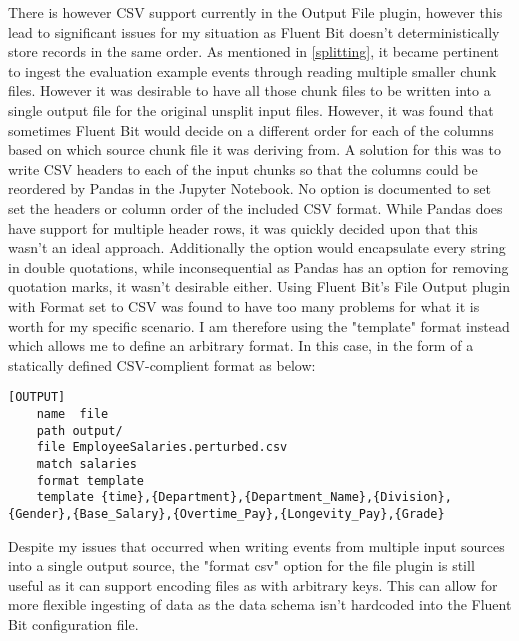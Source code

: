 There is however CSV support currently in the Output File plugin, however this lead to significant issues for my situation as Fluent Bit doesn't deterministically store records in the same order. As mentioned in \ref{splitting}, it became pertinent to ingest the evaluation example events through reading multiple smaller chunk files. However it was desirable to have all those chunk files to be written into a single output file for the original unsplit input files. However, it was found that sometimes Fluent Bit would decide on a different order for each of the columns based on which source chunk file it was deriving from. A solution for this was to write CSV headers to each of the input chunks so that the columns could be reordered by Pandas in the Jupyter Notebook. No option is documented to set set the headers or column order of the included CSV format. While Pandas does have support for multiple header rows, it was quickly decided upon that this wasn't an ideal approach. Additionally the option would encapsulate every string in double quotations, while inconsequential as Pandas has an option for removing quotation marks, it wasn't desirable either. Using Fluent Bit's File Output plugin with Format set to CSV was found to have too many problems for what it is worth for my specific scenario. I am therefore using the "template" format instead which allows me to define an arbitrary format. In this case, in the form of a statically defined CSV-complient format as below:
\begin{verbatim}
[OUTPUT]
    name  file
    path output/
    file EmployeeSalaries.perturbed.csv
    match salaries
    format template
    template {time},{Department},{Department_Name},{Division},{Gender},{Base_Salary},{Overtime_Pay},{Longevity_Pay},{Grade}
\end{verbatim}
Despite my issues that occurred when writing events from multiple input sources into a single output source, the "format csv" option for the file plugin is still useful as it can support encoding files as with arbitrary keys. This can allow for more flexible ingesting of data as the data schema isn't hardcoded into the Fluent Bit configuration file.

